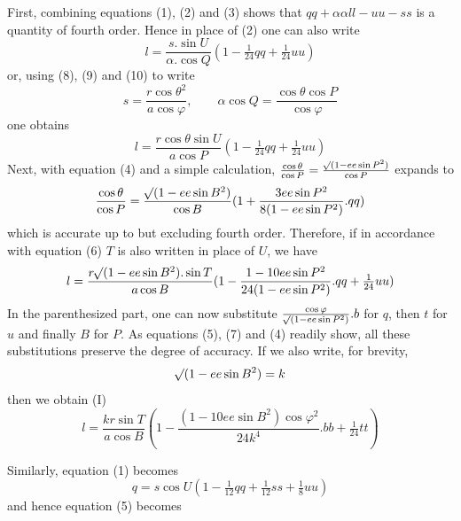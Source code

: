 %
\par\noindent\hspace*{\parindent} First, combining equations (1), (2) and (3) shows that \(qq+\alpha\alpha ll-uu-ss\) is a quantity of fourth order. Hence in place of (2) one can also write
\[
l=\frac{s\mathord{.}\sin U}{\alpha\mathord{.}\cos Q}(1-\tfrac1{24}qq+\tfrac1{24}uu)
\]
or, using (8), (9) and (10) to write
\[
s=\frac{r\cos\theta^2}{a\cos\varphi},\qquad \alpha\cos Q=\frac{\cos\theta\cos P}{\cos\varphi}
\]
one obtains
\[
l=\frac{r\cos\theta\sin U}{a\cos P}(1-\tfrac1{24}qq+\tfrac1{24}uu)
\]
Next, with equation (4) and a simple calculation, \(\frac{\cos\theta}{\cos P}=\frac{\mathord{{}^{}\!\surd}(1-ee\sin P^2)}{\cos P}\) expands to
\[
\frac{\cos\theta}{\cos P}=\frac{\mathord{{}^{}\!\surd}(1-ee\sin B^2)}{\cos B}(1+\frac{3ee\sin P^2}{8(1-ee\sin P^2)}\mathord{.}qq)
\]
which is accurate up to but excluding fourth order. Therefore, if in accordance with equation (6) \(T\) is also written in place of \(U\), we have
\[
l=\frac{r\mathord{{}^{}\!\surd}(1-ee\sin B^2)\mathord{.}\sin T}{a\cos B}(1-\frac{1-10ee\sin P^2}{24(1-ee\sin P^2)}\mathord{.}qq+\tfrac1{24}uu)
\]
In the parenthesized part, one can now substitute \(\frac{\cos\varphi}{\mathord{{}^{}\!\surd}(1-ee\sin P^2)}\mathord{.}b\) for \(q\), then \(t\) for \(u\) and finally \(B\) for \(P\). As equations (5), (7) and (4) readily show, all these substitutions preserve the degree of accuracy. If we also write, for brevity,
\[
\mathord{{}^{}\!\surd}(1-ee\sin B^2)=k
\]
then we obtain (I)
\[
l=\frac{kr\sin T}{a\cos B}(1-\frac{(1-10ee\sin B^2)\cos\varphi^2}{24k^4}\mathord{.}bb+\tfrac1{24}tt)
\]

Similarly, equation (1) becomes
\[
q=s\cos U(1-\tfrac1{12}qq+\tfrac1{12}ss+\tfrac18uu)
\]
and hence equation (5) becomes
